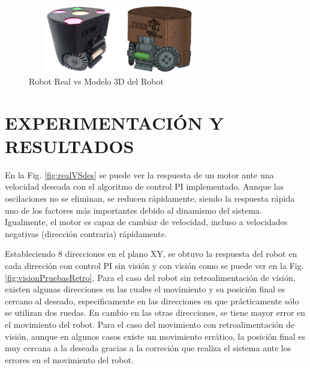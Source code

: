 \documentclass[twocolumn,10pt]{amrob}
\begin{document}
\begin{figure}
  \centering
    \includegraphics[height=3cm,width=8cm]{realVS3D.png}
  \caption{Robot Real vs Modelo 3D del Robot}
  \label{fig:ModRealVSdes}
\end{figure}

\section*{EXPERIMENTACIÓN Y RESULTADOS}

En la Fig. \ref{fig:realVSdes} se puede ver la respuesta de un motor ante una velocidad deseada con el algoritmo de control PI implementado. Aunque las oscilaciones no se eliminan, se reducen rápidamente, siendo la respuesta rápida uno de los factores más importantes debido al dinamismo del sistema. Igualmente, el motor es capaz de cambiar de velocidad, incluso a velocidades negativas (dirección contraria) rápidamente.

Estableciendo 8 direcciones en el plano XY, se obtuvo la respuesta del robot en cada dirección con control PI sin visión y con visión como se puede ver en la Fig. \ref{fig:visionPruebasRetro}. Para el caso del robot sin retroalimentación de visión, existen algunas direcciones en las cuales el movimiento y su posición final es cercano al deseado, especificamente en las direcciones en que prácticamente sólo se utilizan dos ruedas. En cambio en las otras direcciones, se tiene mayor error en el movimiento del robot. Para el caso del movimiento con retroalimentación de visión, aunque en algunos casos existe un movimiento errático, la posición final es muy cercana a la deseada gracias a la correción que realiza el sistema ante los errores en el movimiento del robot.
\end{document}
